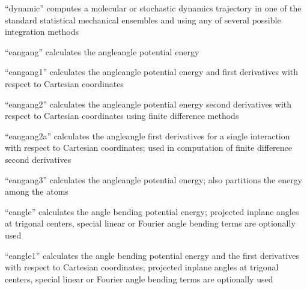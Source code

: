 \documentclass[letterpaper,11pt,english]{sphinxmanual}
\begin{document}
\sphinxAtStartPar
{}

\sphinxAtStartPar
“dynamic” computes a molecular or stochastic dynamics trajectory in one of the standard statistical mechanical ensembles and using any of several possible integration methods

\sphinxAtStartPar
{}

\sphinxAtStartPar
“eangang” calculates the angle\sphinxhyphen{}angle potential energy

\sphinxAtStartPar
{}

\sphinxAtStartPar
“eangang1” calculates the angle\sphinxhyphen{}angle potential energy and first derivatives with respect to Cartesian coordinates

\sphinxAtStartPar
{}

\sphinxAtStartPar
“eangang2” calculates the angle\sphinxhyphen{}angle potential energy second derivatives with respect to Cartesian coordinates using finite difference methods

\sphinxAtStartPar
{}

\sphinxAtStartPar
“eangang2a” calculates the angle\sphinxhyphen{}angle first derivatives for a single interaction with respect to Cartesian coordinates; used in computation of finite difference second derivatives

\sphinxAtStartPar
{}

\sphinxAtStartPar
“eangang3” calculates the angle\sphinxhyphen{}angle potential energy; also partitions the energy among the atoms

\sphinxAtStartPar
{}

\sphinxAtStartPar
“eangle” calculates the angle bending potential energy; projected in\sphinxhyphen{}plane angles at trigonal centers, special linear or Fourier angle bending terms are optionally used

\sphinxAtStartPar
{}

\sphinxAtStartPar
“eangle1” calculates the angle bending potential energy and the first derivatives with respect to Cartesian coordinates; projected in\sphinxhyphen{}plane angles at trigonal centers, special linear or Fourier angle bending terms are optionally used

\sphinxAtStartPar
{}
\end{document}
